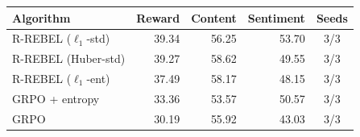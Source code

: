 \begin{tabular}{lrrrc}
\toprule
Algorithm & Reward & Content & Sentiment & Seeds \\
\midrule
R-REBEL ($\ell_1$-std) & 39.34 & 56.25 & 53.70 & 3/3 \\
R-REBEL (Huber-std) & 39.27 & 58.62 & 49.55 & 3/3 \\
R-REBEL ($\ell_1$-ent) & 37.49 & 58.17 & 48.15 & 3/3 \\
GRPO + entropy & 33.36 & 53.57 & 50.57 & 3/3 \\
GRPO & 30.19 & 55.92 & 43.03 & 3/3 \\
\bottomrule
\end{tabular}
